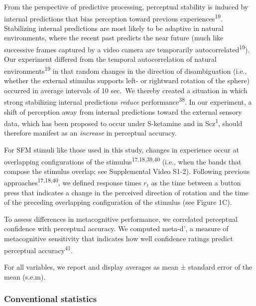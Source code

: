 \documentclass[
]{article}
\begin{document}
From the perspective of predictive processing, perceptual stability is
induced by internal predictions that bias perception toward previous
experiences\textsuperscript{19}. Stabilizing internal predictions are
most likely to be adaptive in natural environments, where the recent
past predicts the near future (much like successive frames captured by a
video camera are temporarily autocorrelated\textsuperscript{19}). Our
experiment differed from the temporal autocorrelation of natural
environments\textsuperscript{19} in that random changes in the direction
of disambiguation (i.e., whether the external stimulus supports left- or
rightward rotation of the sphere) occurred in average intervals of 10
sec.~We thereby created a situation in which strong stabilizing internal
predictions \emph{reduce} performance\textsuperscript{38}. In our
experiment, a shift of perception away from internal predictions toward
the external sensory data, which has been proposed to occur under
S-ketamine and in Scz\textsuperscript{1}, should therefore manifest as
an \emph{increase} in perceptual accuracy.

For SFM stimuli like those used in this study, changes in experience
occur at overlapping configurations of the
stimulus\textsuperscript{17,18,39,40} (i.e., when the bands that compose
the stimulus overlap; see Supplemental Video S1-2). Following previous
approaches\textsuperscript{17,18,40}, we defined response times \(r_t\)
as the time between a button press that indicates a change in the
perceived direction of rotation and the time of the preceding
overlapping configuration of the stimulus (see Figure 1C).

To assess differences in metacognitive performance, we correlated
perceptual confidence with perceptual accuracy. We computed meta-d', a
measure of metacognitive sensitivity that indicates how well confidence
ratings predict perceptual accuracy\textsuperscript{41}.

For all variables, we report and display averages as mean ± standard
error of the mean (s.e.m).

\subsubsection{Conventional statistics}\label{conventional-statistics}
\end{document}
